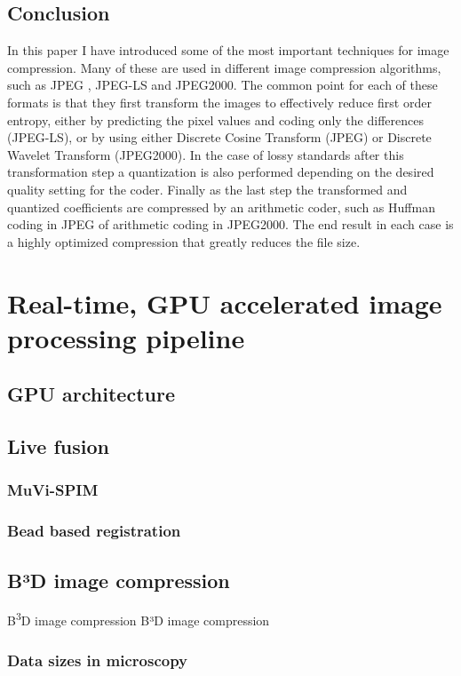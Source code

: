 \documentclass{diploma_style}
\def\b3d{B\textsuperscript{3}D}
\begin{document}
\section{Conclusion}
In this paper I have introduced some of the most important techniques for image compression. Many of these are used in different image compression algorithms, such as JPEG \cite{pennebaker_jpeg:_1992}, JPEG-LS \cite{weinberger_loco-i_2000} and JPEG2000. The common point for each of these formats is that they first transform the images to effectively reduce first order entropy, either by predicting the pixel values and coding only the differences (JPEG-LS), or by using either Discrete Cosine Transform (JPEG) or Discrete Wavelet Transform (JPEG2000). In the case of lossy standards after this transformation step a quantization is also performed depending on the desired quality setting for the coder. Finally as the last step the transformed and quantized coefficients are compressed by an arithmetic coder, such as Huffman coding in JPEG of arithmetic coding in JPEG2000. The end result in each case is a highly optimized compression that greatly reduces the file size.




\chapter{Real-time, GPU accelerated image processing pipeline}
\section{GPU architecture}

\section{Live fusion}
    \subsection{MuVi-SPIM}
    \subsection{Bead based registration}

\section{B³D image compression}
\b3d image compression
B³D image compression

\subsection{Data sizes in microscopy}
\end{document}
